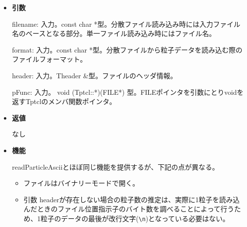 \begin{itemize}

\item {\bf 引数}

filename: 入力。const char *型。分散ファイル読み込み時には入力ファイル名のベースとなる部分。単一ファイル読み込み時にはファイル名。

format: 入力。const char *型。分散ファイルから粒子データを読み込む際の
ファイルフォーマット。

header: 入力。Theader \&型。ファイルのヘッダ情報。

pFunc: 入力。 void (Tptcl::*)(FILE*) 型。FILEポインタを引数にとりvoidを返すTptclのメンバ関数ポインタ。


\item {\bf 返値}

なし

\item {\bf 機能}

readParticleAsciiとほぼ同じ機能を提供するが、下記の点が異なる。
\begin{itemize}
\item ファイルはバイナリーモードで開く。
\item 引数 headerが存在しない場合の粒子数の推定は、実際に1粒子を読み込んだときのファイル位置指示子のバイト数を調べることによって行うため、1粒子のデータの最後が改行文字(\texttt{\textbackslash n})となっている必要はない。
\end{itemize}

\end{itemize}

\label{sec:writeParticleAscii}

